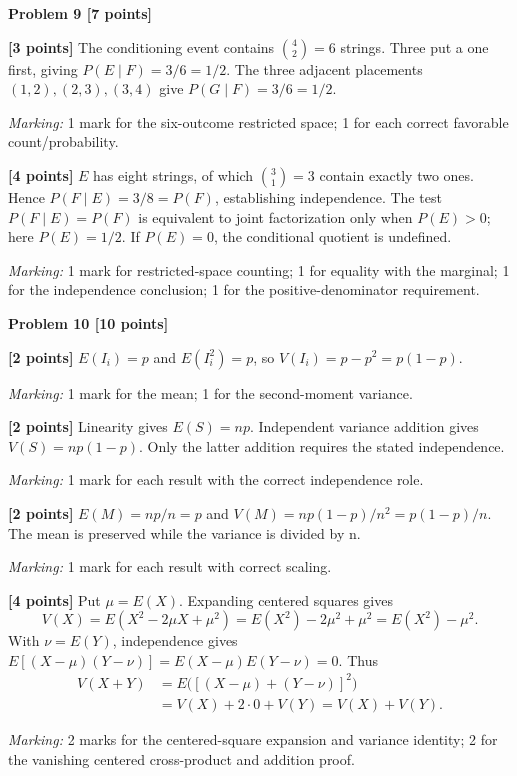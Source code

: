 \documentclass[12pt,letterpaper]{article}
\newcommand{\problemheading}[2][5\baselineskip]{\Needspace{#1}\par\noindent\hspace*{-0.625in}\textbf{#2}\par\nobreak\vspace{0.3em}}
\begin{document}
\vspace{0.65em}
\problemheading[\dimexpr 3\baselineskip+4\baselineskip\relax]{Problem 9 [7 points]}
\begin{description}[font=\normalfont,leftmargin=1.2em,labelsep=0.4em]
\item[(a)] \textbf{[3 points]} The conditioning event contains $\binom42=6$ strings. Three put a one first, giving $P(E\mid F)=3/6=1/2$. The three adjacent placements $(1,2),(2,3),(3,4)$ give $P(G\mid F)=3/6=1/2$.
\par\textit{Marking:} 1 mark for the six-outcome restricted space; 1 for each correct favorable count/probability.
\item[(b)] \textbf{[4 points]} $E$ has eight strings, of which $\binom31=3$ contain exactly two ones. Hence $P(F\mid E)=3/8=P(F)$, establishing independence. The test $P(F\mid E)=P(F)$ is equivalent to joint factorization only when $P(E)>0$; here $P(E)=1/2$. If $P(E)=0$, the conditional quotient is undefined.
\par\textit{Marking:} 1 mark for restricted-space counting; 1 for equality with the marginal; 1 for the independence conclusion; 1 for the positive-denominator requirement.
\end{description}
\vspace{0.65em}
\problemheading[\dimexpr 3\baselineskip+4\baselineskip\relax]{Problem 10 [10 points]}
\begin{description}[font=\normalfont,leftmargin=1.2em,labelsep=0.4em]
\item[(a)] \textbf{[2 points]} $E(I_i)=p$ and $E(I_i^2)=p$, so $V(I_i)=p-p^2=p(1-p)$.
\par\textit{Marking:} 1 mark for the mean; 1 for the second-moment variance.
\item[(b)] \textbf{[2 points]} Linearity gives $E(S)=np$. Independent variance addition gives $V(S)=np(1-p)$. Only the latter addition requires the stated independence.
\par\textit{Marking:} 1 mark for each result with the correct independence role.
\item[(c)] \textbf{[2 points]} $E(M)=np/n=p$ and $V(M)=np(1-p)/n^2=p(1-p)/n$. The mean is preserved while the variance is divided by n.
\par\textit{Marking:} 1 mark for each result with correct scaling.
\item[(d)] \textbf{[4 points]} Put $\mu=E(X)$. Expanding centered squares gives\[V(X)=E(X^2-2\mu X+\mu^2)=E(X^2)-2\mu^2+\mu^2=E(X^2)-\mu^2.\]With $\nu=E(Y)$, independence gives $E[(X-\mu)(Y-\nu)]=E(X-\mu)E(Y-\nu)=0$. Thus\[\begin{aligned}V(X+Y)&=E\bigl([(X-\mu)+(Y-\nu)]^2\bigr)\\&=V(X)+2\cdot0+V(Y)=V(X)+V(Y).\end{aligned}\]
\par\textit{Marking:} 2 marks for the centered-square expansion and variance identity; 2 for the vanishing centered cross-product and addition proof.
\end{description}
\end{document}
